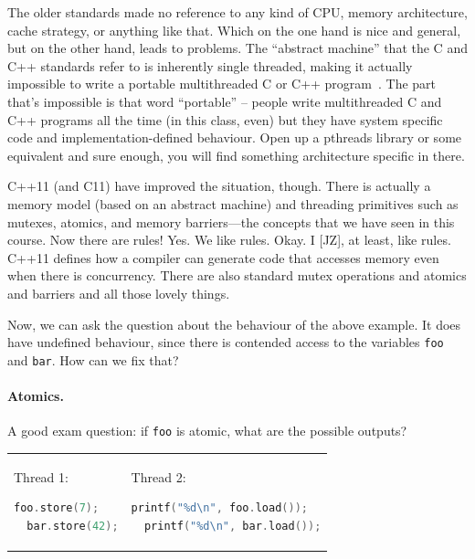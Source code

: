 \documentclass[a4paper]{report}
\begin{document}
The older standards made no reference to any kind of CPU, memory architecture, cache
strategy, or anything like that. Which on the one hand is nice and general, but on the other hand, leads to problems. The ``abstract machine'' that the C and C++ standards refer to is inherently single threaded, making it actually impossible to write a portable multithreaded C or C++ program~\cite{quora:cppthr}. The part that's impossible is that word ``portable'' -- people write multithreaded C and C++ programs all the time (in this class, even) but they have system specific code and implementation-defined behaviour. Open up a pthreads library or some equivalent and sure enough, you will find something architecture specific in there.

C++11 (and C11) have improved the situation, though. There is actually
a memory model (based on an abstract machine) and threading primitives
such as mutexes, atomics, and memory barriers---the concepts that we
have seen in this course. Now there are rules! Yes. We like rules. Okay. I [JZ], at least, like rules. C++11 defines how a compiler can generate code that accesses memory even when there is concurrency. There are also standard mutex operations and atomics and barriers and all those lovely things.

Now, we can ask the question about the behaviour of the above example.
It does have undefined behaviour, since there is contended access to
the variables {\tt foo} and {\tt bar}. How can we fix that?

\paragraph{Atomics.}
A good exam question: if {\tt foo} is atomic, what are the possible outputs? 
    
    \begin{tabular}{ll}
      \begin{minipage}{.25\textwidth}
        Thread 1:
        \begin{lstlisting}[language=C]
  foo.store(7);
  bar.store(42);
        \end{lstlisting}
      \end{minipage} &
      \begin{minipage}{.45\textwidth}
        Thread 2:
        \begin{lstlisting}[language=C]
  printf("%d\n", foo.load());
  printf("%d\n", bar.load());
        \end{lstlisting}
      \end{minipage}
    \end{tabular}
\end{document}
